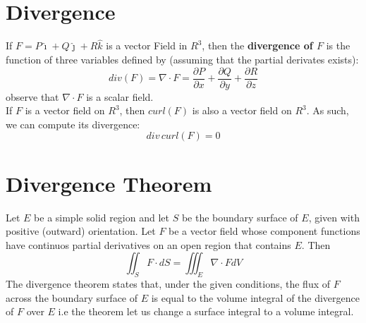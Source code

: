 \documentclass[10pt, twocolumn]{thesis}
\begin{document}
\section{Divergence}
If $F=P\hat{\imath}+Q\hat{\jmath}+R\hat{k}$ is a vector Field in $R^3$, then the \textbf{divergence of $F$} is the function of three variables defined by (assuming that the partial derivates exists):
\[div(F)=\nabla\cdot F=\frac{\partial P}{\partial x}+\frac{\partial Q}{\partial y}+\frac{\partial R}{\partial z}\]
observe that $\nabla\cdot F$ is a scalar field.\\
If $F$ is a vector field on $R^3$, then $curl(F)$ is also a vector field on $R^3$. As such, we can compute its divergence:
\[div\,curl(F)=0\]
\section{Divergence Theorem}
Let $E$ be a simple solid region and let $S$ be the boundary surface of $E$, given with positive (outward) orientation. Let $F$ be a vector field whose component functions have continuos partial derivatives on an open region that contains $E$. Then
\[\iint_{S}F\cdot dS = \iiint_{E}\nabla\cdot FdV\]
The divergence theorem states that, under the given conditions, the flux of $F$ across the boundary surface of $E$ is equal to the volume integral of the divergence of $F$ over $E$ i.e the theorem let us change a surface integral to a volume integral.


\end{document}

